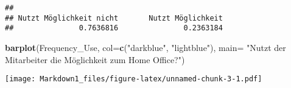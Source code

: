 \documentclass[
]{article}
\newenvironment{Shaded}{\begin{snugshade}}{\end{snugshade}}
\newcommand{\AttributeTok}[1]{\textcolor[rgb]{0.13,0.29,0.53}{#1}}
\newcommand{\FunctionTok}[1]{\textcolor[rgb]{0.13,0.29,0.53}{\textbf{#1}}}
\newcommand{\NormalTok}[1]{#1}
\newcommand{\StringTok}[1]{\textcolor[rgb]{0.31,0.60,0.02}{#1}}
\begin{document}
\begin{verbatim}
## 
## Nutzt Möglichkeit nicht       Nutzt Möglichkeit 
##               0.7636816               0.2363184
\end{verbatim}

\begin{Shaded}
\begin{Highlighting}[]
\FunctionTok{barplot}\NormalTok{(Frequency\_Use, }\AttributeTok{col=}\FunctionTok{c}\NormalTok{(}\StringTok{"darkblue"}\NormalTok{, }\StringTok{"lightblue"}\NormalTok{),}
        \AttributeTok{main=} \StringTok{"Nutzt der Mitarbeiter die Möglichkeit zum Home Office?"}\NormalTok{)}
\end{Highlighting}
\end{Shaded}

\texttt{[image: Markdown1\_files/figure-latex/unnamed-chunk-3-1.pdf]}
\end{document}
